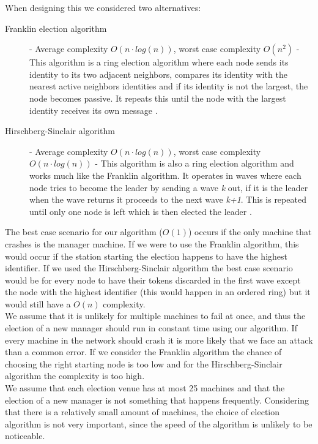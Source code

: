\documentclass[a4paper]{report}
\begin{document}
\noindent When designing this we considered two alternatives:
\begin{description}

\item[Franklin election algorithm] - Average complexity $O(n \cdot log (n))$, worst case complexity $O(n^2)$ - This algorithm is a ring election algorithm where each node sends its identity to its two adjacent neighbors, compares its identity with the nearest active neighbors identities and if its identity is not the largest, the node becomes passive. It repeats this until the node with the largest identity receives its own message \cite{bakshi}.

\item[Hirschberg-Sinclair algorithm] - Average complexity $O(n \cdot log (n))$, worst case complexity $O(n \cdot log (n))$ - This algorithm is also a ring election algorithm and works much like the Franklin algorithm. It operates in waves where each node tries to become the leader by sending a wave \textit{k} out, if it is the leader when the wave returns it proceeds to the next wave \textit{k+1}. This is repeated until only one node is left which is then elected the leader \cite{aiello}. 
\end{description}

The best case scenario for our algorithm ($O(1)$) occurs if the only machine that crashes is the manager machine. If we were to use the Franklin algorithm, this would occur if the station starting the election happens to have the highest identifier. If we used the Hirschberg-Sinclair algorithm the best case scenario would be for every node to have their tokens discarded in the first wave except the node with the highest identifier (this would happen in an ordered ring) but it would still have a $O(n)$ complexity. \\

We assume that it is unlikely for multiple machines to fail at once, and thus the election of a new manager should run in constant time using our algorithm. If every machine in the network should crash it is more likely that we face an attack than a common error. If we consider the Franklin algorithm the chance of choosing the right starting node is too low and for the Hirschberg-Sinclair algorithm the complexity is too high. \\

We assume that each election venue has at most 25 machines and that the election of a new manager is not something that happens frequently. Considering that there is a relatively small amount of machines, the choice of election algorithm is not very important, since the speed of the algorithm is unlikely to be noticeable. 
\end{document}

